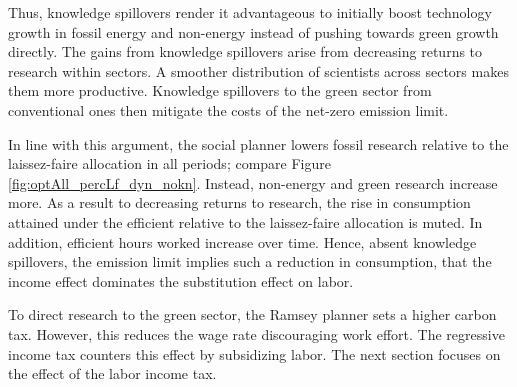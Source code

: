 Thus, knowledge spillovers render it advantageous to initially boost technology growth in fossil energy and non-energy instead of pushing towards green growth directly.
The gains from knowledge spillovers arise from decreasing returns to research within sectors. A smoother distribution of scientists across sectors makes them more productive. Knowledge spillovers to the green sector from conventional ones then mitigate the costs of the net-zero emission limit. 

In line with this argument, the social planner lowers fossil research relative to the laissez-faire allocation in all periods; compare Figure \ref{fig:optAll_percLf_dyn_nokn}. Instead, non-energy and green research increase more. As a result to decreasing returns to research, the rise in consumption attained under the efficient relative to the laissez-faire allocation is muted. In addition, efficient hours worked increase over time.  Hence, absent knowledge spillovers, the emission limit implies such a reduction in consumption, that the income effect dominates the substitution effect on labor. 

To direct research to the green sector, the Ramsey planner sets a higher carbon tax. However, this reduces the wage rate discouraging work effort. The regressive income tax counters this effect by subsidizing labor. The next section focuses on the effect of the labor income tax. 

